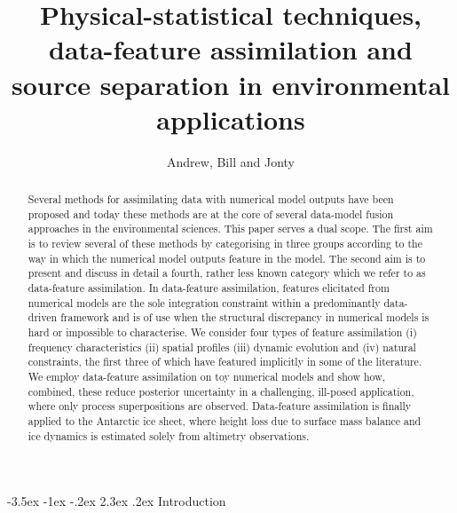 \documentclass[10pt,a4paper]{article}
\title{Physical-statistical techniques, data-feature assimilation and source separation in environmental applications}
\author{Andrew, Bill and Jonty}
\makeatletter
\renewcommand\section{\@startsection{section}{1}{\z@}%
                                  {-3.5ex \@plus -1ex \@minus -.2ex}%
                                  {2.3ex \@plus.2ex}%
                                  {\normalfont\large\bfseries}}
\makeatother
\begin{document}
\maketitle

\begin{abstract}
Several methods for assimilating data with numerical model outputs have been proposed and today these methods are at the core of several data-model fusion approaches in the environmental sciences. This paper serves a dual scope. The first aim is to review several of these methods by categorising in three groups according to the way in which the numerical model outputs feature in the model. The second aim is to present and discuss in detail a fourth, rather less known category which we refer to as data-feature assimilation. In data-feature assimilation, features elicitated from numerical models are the sole integration constraint within a predominantly data-driven framework and is of use when the structural discrepancy in numerical models is hard or impossible to characterise. We consider four types of feature assimilation (i) frequency characteristics (ii) spatial profiles (iii) dynamic evolution and (iv) natural constraints, the first three of which have featured implicitly in some of the literature. We employ data-feature assimilation on toy numerical models and show how, combined, these reduce posterior uncertainty in a challenging, ill-posed application, where only process superpositions are observed. Data-feature assimilation is finally applied to the Antarctic ice sheet, where height loss due to surface mass balance and ice dynamics is estimated solely from altimetry observations.
\end{abstract}


\section{Introduction}
\end{document}
